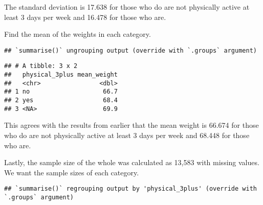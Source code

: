 \documentclass[
]{article}
\newenvironment{Shaded}{\begin{snugshade}}{\end{snugshade}}
\newcommand{\DataTypeTok}[1]{\textcolor[rgb]{0.13,0.29,0.53}{#1}}
\newcommand{\KeywordTok}[1]{\textcolor[rgb]{0.13,0.29,0.53}{\textbf{#1}}}
\newcommand{\NormalTok}[1]{#1}
\newcommand{\OperatorTok}[1]{\textcolor[rgb]{0.81,0.36,0.00}{\textbf{#1}}}
\newcommand{\OtherTok}[1]{\textcolor[rgb]{0.56,0.35,0.01}{#1}}
\newcommand{\StringTok}[1]{\textcolor[rgb]{0.31,0.60,0.02}{#1}}
\begin{document}
The standard deviation is 17.638 for those who do are not physically
active at least 3 days per week and 16.478 for those who are.

Find the mean of the weights in each category.

\begin{Shaded}
\end{Shaded}

\begin{verbatim}
## `summarise()` ungrouping output (override with `.groups` argument)
\end{verbatim}

\begin{verbatim}
## # A tibble: 3 x 2
##   physical_3plus mean_weight
##   <chr>                <dbl>
## 1 no                    66.7
## 2 yes                   68.4
## 3 <NA>                  69.9
\end{verbatim}

This agrees with the results from earlier that the mean weight is 66.674
for those who do are not physically active at least 3 days per week and
68.448 for those who are.

Lastly, the sample size of the whole was calculated as 13,583 with
missing values. We want the sample sizes of each category.

\begin{Shaded}
\end{Shaded}

\begin{verbatim}
## `summarise()` regrouping output by 'physical_3plus' (override with `.groups` argument)
\end{verbatim}
\end{document}
